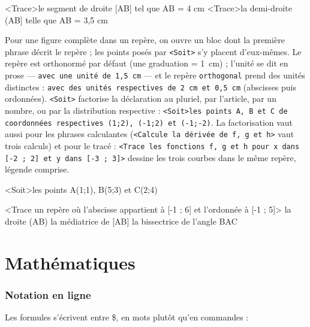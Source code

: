 \documentclass[11pt,a4paper]{article}
\newcommand{\bal}[1]{\texttt{#1}}
\begin{document}
\begin{code}
<Trace>le segment de droite [AB] tel que AB = 4 cm
<Trace>la demi-droite (AB] telle que AB = 3,5 cm
\end{code}

Pour une figure complète dans un repère, on ouvre un bloc dont la
première phrase décrit le repère ; les points posés par \bal{<Soit>}
s'y placent d'eux-mêmes. Le repère est orthonormé par défaut (une
graduation = 1~cm) ; l'unité se dit en prose --- \bal{avec une unité
de 1,5 cm} --- et le repère \bal{orthogonal} prend des unités
distinctes : \bal{avec des unités respectives de 2 cm et 0,5 cm}
(abscisses puis ordonnées). \bal{<Soit>} factorise la déclaration au
pluriel, par l'article, par un nombre, ou par la distribution
respective : \bal{<Soit>les points A, B et C de coordonnées
respectives (1;2), (-1;2) et (-1;-2)}. La factorisation vaut aussi
pour les phrases calculantes (\bal{<Calcule la dérivée de f, g et
h>} vaut trois calculs) et pour le tracé : \bal{<Trace les fonctions
f, g et h pour x dans [-2 ; 2] et y dans [-3 ; 3]>} dessine les
trois courbes dans le même repère, légende comprise.

\begin{code}
<Soit>les points A(1;1), B(5;3) et C(2;4)

<Trace un repère où l'abscisse appartient à [-1 ; 6]
    et l'ordonnée à [-1 ; 5]>{
    la droite (AB)
    la médiatrice de [AB]
    la bissectrice de l'angle BAC
}
\end{code}

\part{Mathématiques}

\section{Notation en ligne}

Les formules s'écrivent entre \$, en mots plutôt qu'en commandes :
\end{document}
